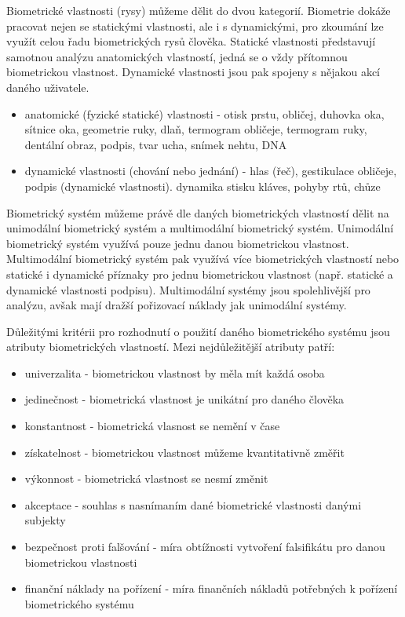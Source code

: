 Biometrické vlastnosti (rysy) můžeme dělit do dvou kategorií. Biometrie dokáže pracovat nejen se statickými vlastnosti, ale i s dynamickými, pro zkoumání lze využít celou řadu biometrických rysů člověka. Statické vlastnosti představují samotnou analýzu anatomických vlastností, jedná se o vždy přítomnou biometrickou vlastnost. Dynamické vlastnosti jsou pak spojeny s nějakou akcí daného uživatele.

\begin{itemize}
    \item anatomické (fyzické statické) vlastnosti - otisk prstu, obličej, duhovka oka, sítnice oka, geometrie ruky, dlaň, termogram obličeje, termogram ruky, dentální obraz, podpis, tvar ucha, snímek nehtu, DNA
    \item dynamické vlastnosti (chování nebo jednání) - hlas (řeč), gestikulace obličeje, podpis (dynamické vlastnosti). dynamika stisku kláves, pohyby rtů, chůze
\end{itemize}

Biometrický systém můžeme právě dle daných biometrických vlastností dělit na unimodální biometrický systém a multimodální biometrický systém. Unimodální biometrický systém využívá pouze jednu danou biometrickou vlastnost. Multimodální biometrický systém pak využívá více biometrických vlastností nebo statické i dynamické příznaky pro jednu biometrickou vlastnost (např. statické a dynamické vlastnosti podpisu). Multimodální systémy jsou spolehlivější pro analýzu, avšak mají dražší pořizovací náklady jak unimodální systémy. \cite{Drahansky}

Důležitými kritérii pro rozhodnutí o použití daného biometrického systému jsou atributy biometrických vlastností. Mezi nejdůležitější atributy patří:

\begin{itemize}
    \item univerzalita - biometrickou vlastnost by měla mít každá osoba
    \item jedinečnost - biometrická vlastnost je unikátní pro daného člověka
    \item konstantnost - biometrická vlasnost se nemění v čase
    \item získatelnost - biometrickou vlastnost můžeme kvantitativně změřit
    \item výkonnost - biometrická vlastnost se nesmí změnit
    \item akceptace - souhlas s nasnímaním dané biometrické vlastnosti danými subjekty
    \item bezpečnost proti falšování - míra obtížnosti vytvoření falsifikátu pro danou biometrickou vlastnosti
    \item finanční náklady na pořízení - míra finančních nákladů potřebných k pořízení biometrického systému \cite{Drahansky}
\end{itemize}


